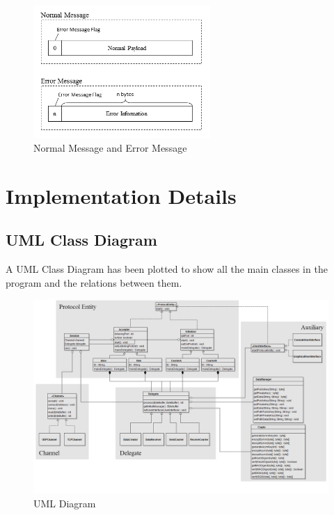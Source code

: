 \begin{figure}[h!]
\centering
\includegraphics[width=0.6\textwidth,natwidth=469,natheight=351]{figures/normalvserrormessage.png}
\caption{Normal Message and Error Message}
\end{figure}

\section{Implementation Details}
\subsection{UML Class Diagram}
A UML Class Diagram has been plotted to show all the main classes in the program and the relations between them.
\begin{figure}[h!]
\centering
\includegraphics[width=\textwidth,natwidth=1416,natheight=935]{figures/umldiagram.jpg}
\caption{UML Diagram}
\end{figure}

